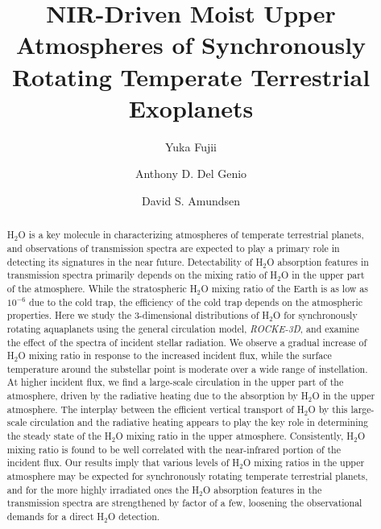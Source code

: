 \documentclass[11pt,numberedappendix,twocolappendix,]{emulateapj}
\def\water{H$_2$O }
\begin{document}
\title{NIR-Driven Moist Upper Atmospheres of Synchronously Rotating Temperate Terrestrial Exoplanets}
\author{Yuka Fujii}
\author{Anthony D. Del Genio}
\author{David S. Amundsen}

\begin{abstract}

\water is a key molecule in characterizing atmospheres of temperate terrestrial planets, and observations of transmission spectra are expected to play a primary role in detecting its signatures in the near future. 
%
Detectability of \water absorption features in transmission spectra primarily depends on the mixing ratio of \water in the upper part of the atmosphere. 
%
While the stratospheric \water mixing ratio of the Earth is as low as $10^{-6}$ due to the cold trap, the efficiency of the cold trap depends on the atmospheric properties. 
%
Here we study the 3-dimensional distributions of \water for synchronously rotating aquaplanets using the general circulation model, {\it ROCKE-3D}, and examine the effect of the  spectra of incident stellar radiation. 
%
We observe a gradual increase of \water mixing ratio in response to the increased incident flux, while the surface temperature around the substellar point is moderate over a wide range of instellation. 
%
At higher incident flux, we find a large-scale circulation in the upper part of the atmosphere, driven by the radiative heating due to the absorption by \water in the upper atmosphere. 
%
The interplay between the efficient vertical transport of \water by this large-scale circulation and the radiative heating appears to play the key role in determining the steady state of the \water mixing ratio in the upper atmosphere.  
%
Consistently, \water mixing ratio is found to be well correlated with the near-infrared portion of the incident flux. 
%
Our results imply that various levels of \water mixing ratios in the upper atmosphere may be expected for synchronously rotating temperate terrestrial planets, and for the more highly irradiated ones the \water absorption features in the transmission spectra are strengthened by factor of a few, loosening the observational demands for a direct H$_2$O detection. 
%
\end{abstract}
\end{document}
